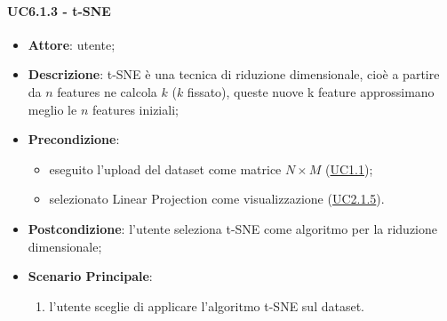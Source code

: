    \paragraph{UC6.1.3 - t-SNE}
    \label{uc6.1.3}
    \begin{itemize}
    \item \textbf{Attore}: utente;
    \item \textbf{Descrizione}: t-SNE è una tecnica di riduzione dimensionale, cioè a partire da $n$ features ne calcola $k$ ($k$ fissato), queste nuove k feature approssimano meglio le $n$ features iniziali;
    \item \textbf{Precondizione}: 
    \begin{itemize}
        \item eseguito l'upload del dataset come matrice $N\times M$ (\hyperref[uc1.1]{UC1.1});
        \item selezionato Linear Projection come visualizzazione (\hyperref[uc2.1.5]{UC2.1.5}).
    \end{itemize}  
    \item \textbf{Postcondizione}: l'utente seleziona t-SNE come algoritmo per la riduzione dimensionale;
    \item \textbf{Scenario Principale}: 
    \begin{enumerate}
        \item l'utente sceglie di applicare l'algoritmo t-SNE sul dataset.
    \end{enumerate}
    \end{itemize}
    

